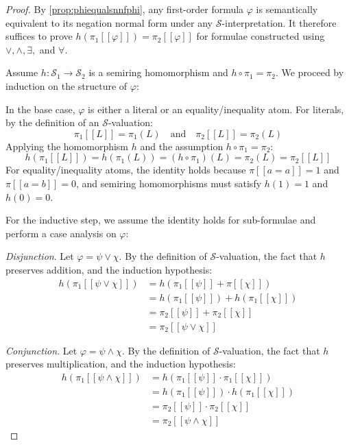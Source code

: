 \documentclass[oneside, 11pt]{amsbook}
\theoremstyle{plain}
\theoremstyle{definition}
\theoremstyle{remark}
\begin{document}
\begin{proof}
    By \autoref{prop:phiequalsnnfphi}, any first-order formula $\varphi$ is semantically equivalent to its negation normal form under any $\mathcal{S}$-interpretation. It therefore suffices to prove $h(\pi_1 [\![ \varphi ]\!]) = \pi_2 [\![ \varphi ]\!]$ for formulae constructed using $\lor, \land, \exists,$ and $\forall$.

    Assume $h: \mathcal{S}_1 \to \mathcal{S}_2$ is a semiring homomorphism and $h \circ \pi_1 = \pi_2$. We proceed by induction on the structure of $\varphi$:

    In the base case, $\varphi$ is either a literal or an equality/inequality atom. For literals, by the definition of an $\mathcal{S}$-valuation:
    \[
        \pi_1 [\![ L ]\!] = \pi_1(L) \quad \text{and} \quad \pi_2 [\![ L ]\!] = \pi_2(L)
    \]
    Applying the homomorphism $h$ and the assumption $h \circ \pi_1 = \pi_2$:
    \[
        h(\pi_1 [\![ L ]\!]) = h(\pi_1(L)) = (h \circ \pi_1)(L) = \pi_2(L) = \pi_2 [\![ L ]\!]
    \]
    For equality/inequality atoms, the identity holds because $\pi [\![ a=a ]\!] = 1$ and $\pi [\![ a=b ]\!] = 0$, and semiring homomorphisms must satisfy $h(1)=1$ and $h(0)=0$.

    For the inductive step, we assume the identity holds for sub-formulae and perform a case analysis on $\varphi$:

    \emph{Disjunction}. Let $\varphi = \psi \lor \chi$. By the definition of $\mathcal{S}$-valuation, the fact that $h$ preserves addition, and the induction hypothesis:
    \[
        \begin{aligned}
            h(\pi_1 [\![ \psi \lor \chi ]\!]) & = h(\pi_1 [\![ \psi ]\!] + \pi [\![ \chi ]\!])      \\
                                              & = h(\pi_1 [\![ \psi ]\!]) + h(\pi_1 [\![ \chi ]\!]) \\
                                              & = \pi_2 [\![ \psi ]\!] + \pi_2 [\![ \chi ]\!]       \\
                                              & = \pi_2 [\![ \psi \lor \chi ]\!]
        \end{aligned}
    \]

    \emph{Conjunction}. Let $\varphi = \psi \land \chi$. By the definition of $\mathcal{S}$-valuation, the fact that $h$ preserves multiplication, and the induction hypothesis:
    \[
        \begin{aligned}
            h(\pi_1 [\![ \psi \land \chi ]\!]) & = h(\pi_1 [\![ \psi ]\!] \cdot \pi_1 [\![ \chi ]\!])    \\
                                               & = h(\pi_1 [\![ \psi ]\!]) \cdot h(\pi_1 [\![ \chi ]\!]) \\
                                               & = \pi_2 [\![ \psi ]\!] \cdot \pi_2 [\![ \chi ]\!]       \\
                                               & = \pi_2 [\![ \psi \land \chi ]\!]
        \end{aligned}
    \]


\end{proof}
\end{document}
